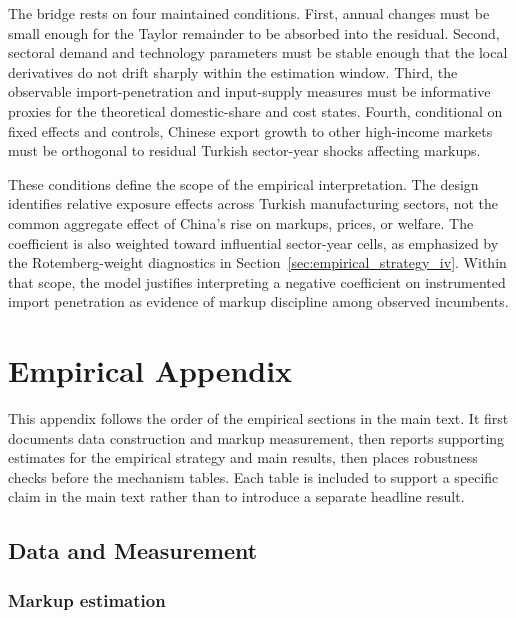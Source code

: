 ﻿\documentclass[12pt]{article}
\begin{document}
The bridge rests on four maintained conditions. First, annual changes must be small enough for the Taylor remainder to be absorbed into the residual. Second, sectoral demand and technology parameters must be stable enough that the local derivatives do not drift sharply within the estimation window. Third, the observable import-penetration and input-supply measures must be informative proxies for the theoretical domestic-share and cost states. Fourth, conditional on fixed effects and controls, Chinese export growth to other high-income markets must be orthogonal to residual Turkish sector-year shocks affecting markups.

These conditions define the scope of the empirical interpretation. The design identifies relative exposure effects across Turkish manufacturing sectors, not the common aggregate effect of China's rise on markups, prices, or welfare. The coefficient is also weighted toward influential sector-year cells, as emphasized by the Rotemberg-weight diagnostics in Section~\ref{sec:empirical_strategy_iv}. Within that scope, the model justifies interpreting a negative coefficient on instrumented import penetration as evidence of markup discipline among observed incumbents.

\section{Empirical Appendix}
\small
\setlength{\textfloatsep}{0.55\baselineskip}
\setlength{\floatsep}{0.55\baselineskip}
\setlength{\intextsep}{0.55\baselineskip}
\setlength{\abovecaptionskip}{0.25\baselineskip}
\setlength{\belowcaptionskip}{0pt}

This appendix follows the order of the empirical sections in the main text. It first documents data construction and markup measurement, then reports supporting estimates for the empirical strategy and main results, then places robustness checks before the mechanism tables. Each table is included to support a specific claim in the main text rather than to introduce a separate headline result.

\subsection{Data and Measurement}

\subsubsection{Markup estimation}
\label{app:markup_estimation}
\end{document}
